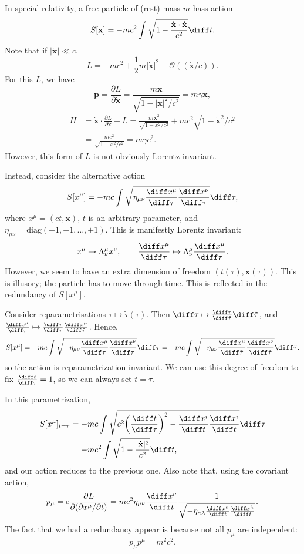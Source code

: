 \documentclass[12pt]{article}
\begin{document}
In special relativity, a free particle of (rest) mass $m$ hass action
\[
	S[\mathbf{x}] = -mc^2 \int \sqrt{1 - \frac{\mathbf{\dot x} \cdot \mathbf{\dot x}}{c^2}} \diff t.
\]
Note that if $|\mathbf{\dot x}| \ll c$,
\[
L = -mc^2 + \frac{1}{2} m |\mathbf{\dot x}|^2 + \mathcal{O}((\mathbf{\dot x}/c)).
\]
For this $L$, we have
\[
\mathbf{p} = \frac{\partial L}{\partial \mathbf{\dot x}} = \frac{m \mathbf{\dot x}}{\sqrt{1 - |\mathbf{\dot x}|^2/c^2}} = m \gamma \mathbf{\dot x},
\]
\begin{align*}
	H &= \mathbf{\dot x} \cdot \frac{\partial L}{\partial \mathbf{\dot x}} - L = \frac{m \mathbf{\dot x}^2}{\sqrt{1-x^2/c^2}} + mc^2\sqrt{1-\mathbf{\dot x}^2/c^2} \\
	  &= \frac{mc^2}{\sqrt{1-x^2/c^2}} = m\gamma c^2.
\end{align*}
However, this form of $L$ is not obviously Lorentz invariant.

Instead, consider the alternative action
\[
	S[x^{\mu}] = -mc \int \sqrt{\eta_{\mu \nu} \frac{\diff x^{\mu}}{\diff \tau} \frac{\diff x^{\nu}}{\diff \tau}} \diff \tau,
\]
where $x^{\mu} = (ct, \mathbf{x})$, $t$ is an arbitrary parameter, and $\eta_{\mu \nu} = \mathrm{diag}(-1, +1, \ldots, +1)$. This is manifestly Lorentz invariant:
\[
x^{\mu} \mapsto \Lambda^{\mu}_{\nu} x^{\nu}, \qquad \frac{\diff x^{\mu}}{\diff \tau} \mapsto \Lambda^{\mu}_{\nu} \frac{\diff x^{\mu}}{\diff \tau}.
\]
However, we seem to have an extra dimension of freedom $(t(\tau), \mathbf{x}(\tau))$. This is illusory; the particle has to move through time. This is reflected in the redundancy of $S[x^{\mu}]$.

Consider reparametrisations $\tau \mapsto \tilde \tau(\tau)$. Then $\diff \tau \mapsto \frac{\diff \tau}{\diff \tilde \tau} \diff \tilde \tau$, and $\frac{\diff x^{\mu}}{\diff \tau} \mapsto \frac{\diff \tilde \tau}{\diff \tau} \frac{\diff x^{\mu}}{\diff \tilde \tau}$. Hence,
\[
	S[x^{\mu}] = - mc \int \sqrt{-\eta_{\mu \nu} \frac{\diff x^{\mu}}{\diff \tau} \frac{\diff x^{\nu}}{\diff \tau}} \diff \tau = -mc \int \sqrt{-\eta_{\mu\nu} \frac{\diff x^{\mu}}{\diff \tilde \tau} \frac{\diff x^{\nu}}{\diff \tilde \tau}} \diff \tilde \tau.
\]
so the action is reparametrization invariant. We can use this degree of freedom to fix $\frac{\diff t}{\diff \tau} = 1$, so we can always set $t = \tau$.

In this parametrization,
\begin{align*}
	S[x^\mu]_{t = \tau} &= - mc \int \sqrt{c^2 \biggl( \frac{\diff t}{\diff\tau}\biggr)^2 - \frac{\diff x^i}{\diff t} \frac{\diff x^i}{ \diff t}} \diff \tau \\
			    &= -mc^2 \int \sqrt{1 - \frac{|\mathbf{\dot x}|^2}{c^2}} \diff t,
\end{align*}
and our action reduces to the previous one. Also note that, using the covariant action,
\[
	p_\mu = c \frac{\partial L}{\partial (\partial x^\mu/\partial t)} = mc^2 \eta_{\mu \nu} \frac{\diff x^\nu}{\diff t} \frac{1}{\sqrt{-\eta_{\kappa \lambda} \frac{\diff x^{\kappa}}{\diff t} \frac{\diff x^\lambda}{\diff t}}}.
\]
The fact that we had a redundancy appear is because not all $p_\mu$ are independent:
\[
p_\mu p^\mu = m^2c^2.
\]
\end{document}
